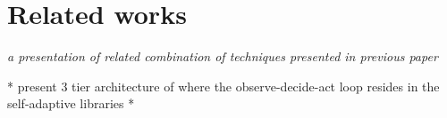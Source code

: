 
\section{Related works}
\label{sec:related}

\emph{a presentation of related combination of techniques presented in previous paper}

* present 3 tier architecture of \cite{evolvable} where the observe-decide-act loop resides in the self-adaptive libraries *